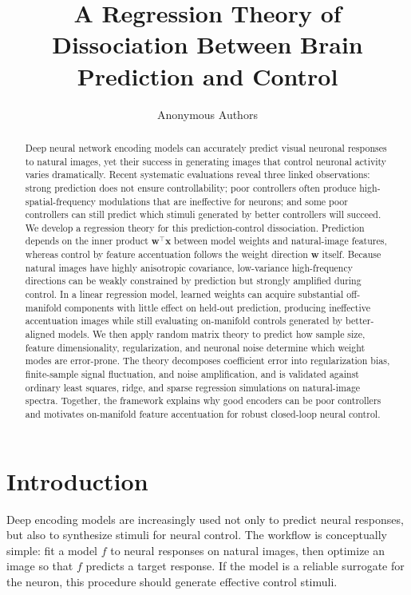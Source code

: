 \documentclass{article}
\title{A Regression Theory of Dissociation Between Brain Prediction and Control}
\author{Anonymous Authors}
\begin{document}
\maketitle

\begin{abstract}
Deep neural network encoding models can accurately predict visual neuronal responses to natural images, yet their success in generating images that control neuronal activity varies dramatically. Recent systematic evaluations reveal three linked observations: strong prediction does not ensure controllability; poor controllers often produce high-spatial-frequency modulations that are ineffective for neurons; and some poor controllers can still predict which stimuli generated by better controllers will succeed. We develop a regression theory for this prediction-control dissociation. Prediction depends on the inner product $\mathbf{w}^{\top}\mathbf{x}$ between model weights and natural-image features, whereas control by feature accentuation follows the weight direction $\mathbf{w}$ itself. Because natural images have highly anisotropic covariance, low-variance high-frequency directions can be weakly constrained by prediction but strongly amplified during control. In a linear regression model, learned weights can acquire substantial off-manifold components with little effect on held-out prediction, producing ineffective accentuation images while still evaluating on-manifold controls generated by better-aligned models. We then apply random matrix theory to predict how sample size, feature dimensionality, regularization, and neuronal noise determine which weight modes are error-prone. The theory decomposes coefficient error into regularization bias, finite-sample signal fluctuation, and noise amplification, and is validated against ordinary least squares, ridge, and sparse regression simulations on natural-image spectra. Together, the framework explains why good encoders can be poor controllers and motivates on-manifold feature accentuation for robust closed-loop neural control.
\end{abstract}

\section{Introduction}

Deep encoding models are increasingly used not only to predict neural responses, but also to synthesize stimuli for neural control. The workflow is conceptually simple: fit a model $f$ to neural responses on natural images, then optimize an image so that $f$ predicts a target response. If the model is a reliable surrogate for the neuron, this procedure should generate effective control stimuli.
\end{document}
